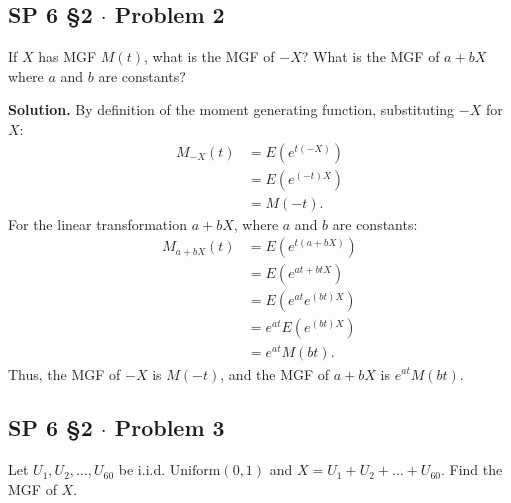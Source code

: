 \documentclass[11pt,a4paper]{article}
\begin{document}
\vspace{10pt}
\subsection{SP 6 \S2 $\cdot$ Problem 2}
\begin{tcolorbox}[title={SP 6 \S2 $\cdot$ Problem 2}]
If $X$ has MGF $M(t)$, what is the MGF of $-X$? What is the MGF of $a + bX$ where $a$ and $b$ are constants?
\end{tcolorbox}

\noindent \textbf{Solution.} By definition of the moment generating function, substituting $-X$ for $X$:
\begin{align*}
M_{-X}(t) &= E\left( e^{t(-X)} \right) \\
&= E\left( e^{(-t)X} \right) \\
&= M(-t).
\end{align*}
For the linear transformation $a + bX$, where $a$ and $b$ are constants:
\begin{align*}
M_{a+bX}(t) &= E\left( e^{t(a + bX)} \right) \\
&= E\left( e^{at + btX} \right) \\
&= E\left( e^{at} e^{(bt)X} \right) \\
&= e^{at} E\left( e^{(bt)X} \right) \\
&= e^{at} M(bt).
\end{align*}
Thus, the MGF of $-X$ is $M(-t)$, and the MGF of $a+bX$ is $e^{at}M(bt)$.

\vspace{10pt}
\subsection{SP 6 \S2 $\cdot$ Problem 3}
\begin{tcolorbox}[title={SP 6 \S2 $\cdot$ Problem 3}]
Let $U_1, U_2, \dots, U_{60}$ be i.i.d. $\text{Uniform}(0, 1)$ and $X = U_1 + U_2 + \dots + U_{60}$. Find the MGF of $X$.
\end{tcolorbox}
\end{document}

